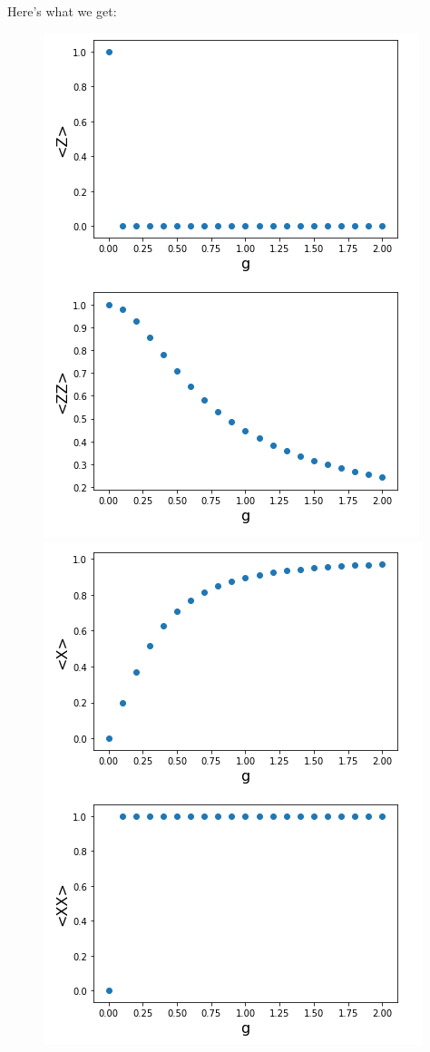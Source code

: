 \documentclass{book}
\theoremstyle{definition}
\begin{document}
Here's what we get:
\begin{figure}[!htb]
	\centering
	\includegraphics[scale=0.5]{ising1}
	\includegraphics[scale=0.5]{ising2}
\end{figure}
\end{document}
